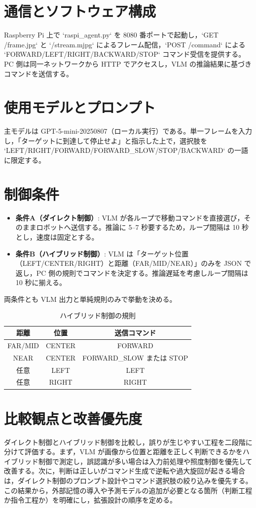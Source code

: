 \documentclass[a4paper,11pt]{ltjsreport}
\begin{document}
\section{通信とソフトウェア構成}
Raspberry Pi 上で `raspi\_agent.py` を 8080 番ポートで起動し，`GET /frame.jpg` と `/stream.mjpg` によるフレーム配信，`POST /command` による `FORWARD/LEFT/RIGHT/BACKWARD/STOP` コマンド受信を提供する。PC 側は同一ネットワークから HTTP でアクセスし，VLM の推論結果に基づきコマンドを送信する。

\section{使用モデルとプロンプト}
主モデルは GPT-5-mini-20250807（ローカル実行）である。単一フレームを入力し，「ターゲットに到達して停止せよ」と指示した上で，選択肢を `LEFT/RIGHT/FORWARD/FORWARD\_SLOW/STOP/BACKWARD` の一語に限定する。

\section{制御条件}
\begin{itemize}
  \item \textbf{条件A（ダイレクト制御）}: VLM が各ループで移動コマンドを直接選び，そのままロボットへ送信する。推論に 5--7 秒要するため，ループ間隔は 10 秒とし，速度は固定とする。
  \item \textbf{条件B（ハイブリッド制御）}: VLM は「ターゲット位置（LEFT/CENTER/RIGHT）と距離（FAR/MID/NEAR）」のみを JSON で返し，PC 側の規則でコマンドを決定する。推論遅延を考慮しループ間隔は 10 秒に揃える。
\end{itemize}
両条件とも VLM 出力と単純規則のみで挙動を決める。

\begin{table}[htbp]
  \centering
  \caption{ハイブリッド制御の規則}
  \label{tab:hybrid-rule}
  \begin{tabular}{|c|c|c|}
    \hline
    距離 & 位置 & 送信コマンド \\
    \hline
    FAR/MID & CENTER & FORWARD \\
    NEAR    & CENTER & FORWARD\_SLOW または STOP \\
    任意    & LEFT   & LEFT \\
    任意    & RIGHT  & RIGHT \\
    \hline
  \end{tabular}
\end{table}

\section{比較観点と改善優先度}
ダイレクト制御とハイブリッド制御を比較し，誤りが生じやすい工程を二段階に分けて評価する。まず，VLM が画像から位置と距離を正しく判断できるかをハイブリッド制御で測定し，誤認識が多い場合は入力前処理や照度制御を優先して改善する。次に，判断は正しいがコマンド生成で逆転や過大旋回が起きる場合は，ダイレクト制御のプロンプト設計やコマンド選択肢の絞り込みを優先する。この結果から，外部記憶の導入や予測モデルの追加が必要となる箇所（判断工程か指令工程か）を明確にし，拡張設計の順序を定める。
\end{document}
